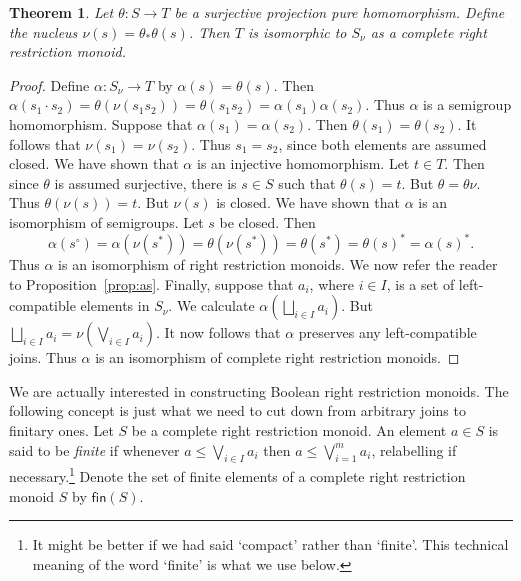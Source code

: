 \documentclass[a4paper]{amsart}
\newtheorem{theorem}{Theorem}[section]
\begin{document}
\begin{theorem}
Let $\theta \colon S \rightarrow T$ be a surjective projection pure homomorphism.
Define the nucleus $\nu (s) = \theta_{\ast} \theta (s)$.
Then $T$ is isomorphic to $S_{\nu}$ as a complete right restriction monoid.
\end{theorem}
\begin{proof} Define $\alpha \colon S_{\nu} \rightarrow T$ by $\alpha (s) = \theta (s)$.
Then $\alpha (s_{1} \cdot s_{2}) = \theta (\nu (s_{1}s_{2})) = \theta (s_{1}s_{2}) = \alpha (s_{1}) \alpha(s_{2})$.
Thus $\alpha$ is a semigroup homomorphism.
Suppose that $\alpha (s_{1}) = \alpha (s_{2})$.
Then $\theta (s_{1}) = \theta (s_{2})$.
It follows that $\nu (s_{1}) = \nu (s_{2})$.
Thus $s_{1} = s_{2}$, since both elements are assumed closed.
We have shown that $\alpha$ is an injective homomorphism.
Let $t \in T$.
Then since $\theta$ is assumed surjective, there is $s \in S$ such that $\theta (s) = t$.
But $\theta = \theta \nu$.
Thus $\theta (\nu (s)) = t$.
But $\nu (s)$ is closed.
We have shown that $\alpha$ is an isomorphism of semigroups.
Let $s$ be closed.
Then 
$$\alpha (s^{\circ}) = \alpha (\nu (s^{\ast})) = \theta (\nu (s^{\ast})) = \theta (s^{\ast}) = \theta (s)^{\ast} = \alpha (s)^{\ast}.$$
Thus $\alpha$ is an isomorphism of right restriction monoids.
We now refer the reader to Proposition~\ref{prop:as}.
Finally, suppose that $a_{i}$, where $i \in I$, is a set of left-compatible elements in $S_{\nu}$.
We calculate $\alpha (\bigsqcup_{i \in I} a_{i})$. 
But $\bigsqcup_{i \in I} a_{i} = \nu (\bigvee_{i \in I} a_{i})$.
It now follows that $\alpha$ preserves any left-compatible joins.
Thus $\alpha$ is an isomorphism of complete right restriction monoids.
\end{proof}




We are actually interested in constructing Boolean right restriction monoids.
The following concept is just what we need to cut down from arbitrary joins to finitary ones.
Let $S$ be a complete right restriction monoid.
An element $a \in S$ is said to be {\em finite} if
whenever $a \leq \bigvee_{i \in I} a_{i}$ then $a \leq \bigvee_{i=1}^{m}a_{i}$,
relabelling if necessary.\footnote{It might be better if we had said `compact' rather than `finite'. This technical meaning of the word `finite' is what we use below.}
Denote the set of finite elements of a complete right restriction monoid $S$ by $\mathsf{fin}(S)$.
\end{document}
